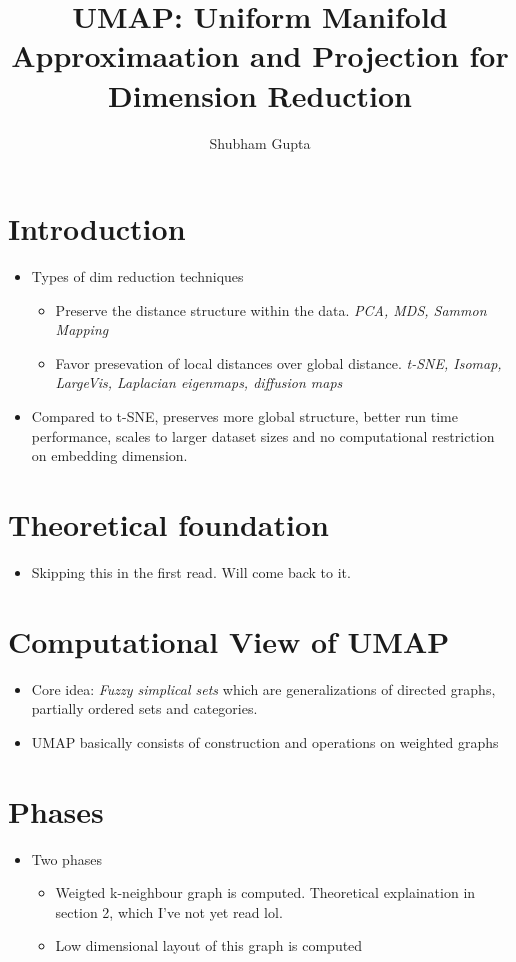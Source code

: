 \documentclass[a4paper]{article}
\title{UMAP: Uniform Manifold Approximaation and Projection for Dimension Reduction}
\author{Shubham Gupta}
\begin{document}
\maketitle
\section{Introduction}
\begin{itemize}
    \item Types of dim reduction techniques
        \begin{itemize}
            \item Preserve the distance structure within the data. \textit{PCA, MDS, Sammon Mapping} 
            \item Favor presevation of local distances over global distance. \textit{t-SNE, Isomap, LargeVis, Laplacian eigenmaps, diffusion maps} 
        \end{itemize}
    \item Compared to t-SNE, preserves more global structure, better run time performance, scales to larger dataset sizes and no computational restriction on embedding dimension.
\end{itemize}
\section{Theoretical foundation}
\begin{itemize}
    \item Skipping this in the first read. Will come back to it.
\end{itemize}
\section{Computational View of UMAP}
\begin{itemize}
    \item Core idea: \textit{Fuzzy simplical sets} which are generalizations of directed graphs, partially ordered sets and categories.
    \item UMAP basically consists of construction and operations on weighted graphs
\end{itemize}
\section{Phases}
\begin{itemize}
    \item Two phases
        \begin{itemize}
            \item Weigted k-neighbour graph is computed. Theoretical explaination in section 2, which I've not yet read lol.
            \item Low dimensional layout of this graph is computed
        \end{itemize}
\end{itemize}
\end{document}
